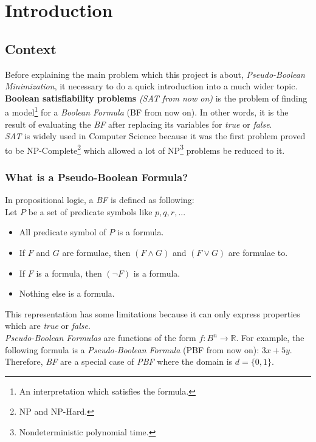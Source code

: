 \chapter{Introduction} %

\label{Chapter1} %

\section{Context}

Before explaining the main problem which this project is about, \emph{Pseudo-Boolean Minimization}, it necessary to do a quick introduction into a much wider topic.\\

\textbf{Boolean satisfiability problems} \textit{(SAT from now on)} is the problem of finding a model\footnote{An interpretation which satisfies the formula.} for a \emph{Boolean Formula} (BF from now on). In other words, it is the result of evaluating the \emph{BF} after replacing its variables for \emph{true} or \emph{false}. 
\\
\emph{SAT} is widely used in Computer Science because it was the first problem proved to be NP-Complete\cite{Cook1971}\footnote{NP and NP-Hard.} which allowed a lot of NP\footnote{Nondeterministic polynomial time.} problems be reduced to it.

\subsection{What is a Pseudo-Boolean Formula?}
In propositional logic, a \emph{BF} is defined as following\cite{Lpo}:\\
Let $P$ be a set of predicate symbols like $p,q,r,...$
\begin{itemize}
	\item All predicate symbol of $P$ is a formula.
	\item If $F$ and $G$ are formulae, then $(F \land G)$ and $(F \lor G)$ are formulae to.
	\item If $F$ is a formula, then $(\neg F)$ is a formula.
	\item Nothing else is a formula.
\end{itemize}
This representation has some limitations because it can only express properties which are \emph{true} or \emph{false}.\\

\emph{Pseudo-Boolean Formulas} are functions of the form $f:B^n \rightarrow \mathbb{R}$. For example, the following formula is a \emph{Pseudo-Boolean Formula} (PBF from now on): $3x+5y$. Therefore, \emph{BF} are a special case of \emph{PBF} where the domain is $d=\{0,1\}$.\\

